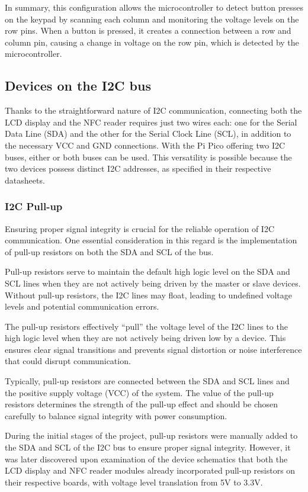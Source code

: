In summary, this configuration allows the microcontroller to detect button presses on the keypad by scanning each column 
and monitoring the voltage levels on the row pins. When a button is pressed, it creates a connection between a row and 
column pin, causing a change in voltage on the row pin, which is detected by the microcontroller.


\subsection{Devices on the I2C bus}

Thanks to the straightforward nature of I2C communication, connecting both the LCD display and the NFC reader requires 
just two wires each: one for the Serial Data Line (SDA) and the other for the Serial Clock Line (SCL), in addition to 
the necessary VCC and GND connections. With the Pi Pico offering two I2C buses, either or both buses can be used. This 
versatility is possible because the two devices possess distinct I2C addresses, as specified in their respective 
datasheets.

\subsubsection*{I2C Pull-up}
Ensuring proper signal integrity is crucial for the reliable operation of I2C communication. One essential consideration 
in this regard is the implementation of pull-up resistors on both the SDA and SCL of the bus.

Pull-up resistors serve to maintain the default high logic level on the SDA and SCL lines when they are not actively 
being driven by the master or slave devices. Without pull-up resistors, the I2C lines may float, leading to undefined 
voltage levels and potential communication errors.

The pull-up resistors effectively ``pull'' the voltage level of the I2C lines to the high logic level when they are not 
actively being driven low by a device. This ensures clear signal transitions and prevents signal distortion or noise 
interference that could disrupt communication.

Typically, pull-up resistors are connected between the SDA and SCL lines and the positive supply voltage (VCC) of the 
system. The value of the pull-up resistors determines the strength of the pull-up effect and should be chosen carefully 
to balance signal integrity with power consumption.

During the initial stages of the project, pull-up resistors were manually added to the SDA and SCL of the I2C bus to 
ensure proper signal integrity. However, it was later discovered upon examination of the device schematics that both the 
LCD display and NFC reader modules already incorporated pull-up resistors on their respective boards, with voltage level 
translation from 5V to 3.3V.

